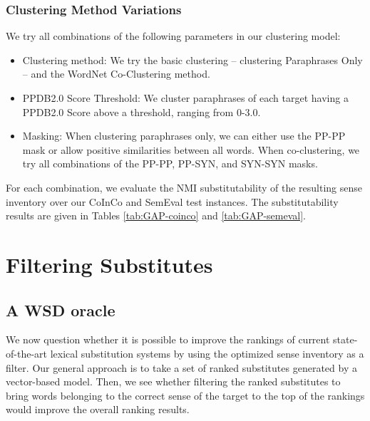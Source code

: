 \documentclass[11pt]{article}
\begin{document}
	\subsubsection{Clustering Method Variations}
	
	We try all combinations of the following parameters in our clustering model:
	
	\begin{itemize}
		\item Clustering method: We try the basic clustering -- clustering Paraphrases Only -- and the WordNet Co-Clustering method.
		\item PPDB2.0 Score Threshold: We cluster paraphrases of each target having a PPDB2.0 Score above a threshold, ranging from 0-3.0.
		\item Masking: When clustering paraphrases only, we can either use the PP-PP mask or allow positive similarities between all words. When co-clustering, we try all combinations of the PP-PP, PP-SYN, and SYN-SYN masks.
	\end{itemize}
	
	For each combination, we evaluate the NMI substitutability of the resulting sense inventory over our CoInCo and SemEval test instances. The substitutability results are given in Tables \ref{tab:GAP-coinco} and \ref{tab:GAP-semeval}.
	
	\section{Filtering Substitutes}
	
	\subsection{A WSD oracle}
	
	We now question whether it is possible to improve the rankings of current state-of-the-art lexical substitution systems by using the optimized sense inventory as a filter. Our general approach is to take a set of ranked substitutes generated by a vector-based model. Then, we see whether filtering the ranked substitutes to bring words belonging to the correct sense of the target to the top of the rankings would improve the overall ranking results. 
	
\end{document}
